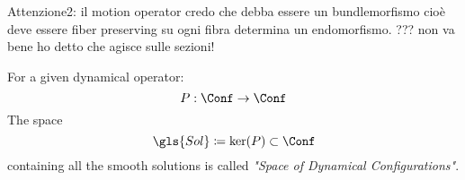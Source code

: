 \documentclass[Main]{subfiles}
\begin{document}
		Attenzione2: il motion operator credo che debba essere un bundlemorfismo cioè deve essere fiber preserving su ogni fibra determina un endomorfismo. ??? non va bene ho detto che agisce sulle sezioni!

		\begin{notationfix}
		For a given dynamical operator:%
		\begin{displaymath}
			P: \Conf \rightarrow \Conf
		\end{displaymath}
		The space
		\begin{displaymath}
		\gls{Sol} \coloneqq \ker(P) \subset \Conf
		\end{displaymath}
		containing all the smooth solutions is called \emph{"Space of Dynamical Configurations"}.
	\end{notationfix}
	
\end{document}
